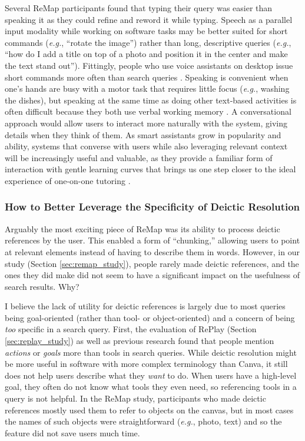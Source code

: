 Several ReMap participants found that typing their query was easier than speaking it as they could refine and reword it while typing. Speech as a parallel input modality while working on software tasks may be better suited for short commands (\textit{e.g.}, ``rotate the image'') rather than long, descriptive queries (\textit{e.g.}, ``how do I add a title on top of a photo and position it in the center and make the text stand out''). Fittingly, people who use voice assistants on desktop issue short commands more often than search queries \cite{Mehrotra2016}. Speaking is convenient when one's hands are busy with a motor task that requires little focus (\textit{e.g.}, washing the dishes), but speaking at the same time as doing other text-based activities is often difficult because they both use verbal working memory \cite{Shneiderman2000a, Begel2006}. A conversational approach would allow users to interact more naturally with the system, giving details when they think of them. As smart assistants grow in popularity and ability, systems that converse with users while also leveraging relevant context will be increasingly useful and valuable, as they provide a familiar form of interaction with gentle learning curves \cite{Klopfenstein2017} that brings us one step closer to the ideal experience of one-on-one tutoring \cite{Bloom1984}.

\subsubsection{How to Better Leverage the Specificity of Deictic Resolution}
Arguably the most exciting piece of ReMap was its ability to process deictic references by the user. This enabled a form of ``chunking,'' \cite{Buxton1986} allowing users to point at relevant elements instead of having to describe them in words. However, in our study (Section \ref{sec:remap_study}), people rarely made deictic references, and the ones they did make did not seem to have a significant impact on the usefulness of search results. Why?

I believe the lack of utility for deictic references is largely due to most queries being goal-oriented (rather than tool- or object-oriented) and a concern of being \textit{too} specific in a search query. First, the evaluation of RePlay (Section \ref{sec:replay_study}) as well as previous research \cite{Bota2018} found that people mention \textit{actions} or \textit{goals} more than tools in search queries. While deictic resolution might be more useful in software with more complex terminology than Canva, it still does not help users describe what they \textit{want} to do. When users have a high-level goal, they often do not know what tools they even need, so referencing tools in a query is not helpful. In the ReMap study, participants who made deictic references mostly used them to refer to objects on the canvas, but in most cases the names of such objects were straightforward (\textit{e.g.}, photo, text) and so the feature did not save users much time.

